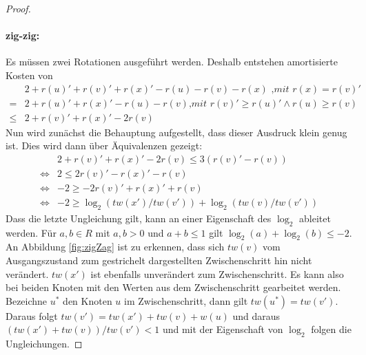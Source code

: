 \documentclass[a4paper,12pt]{article}
\begin{document}
\begin{proof}
	\paragraph{zig-zig:} 
	Es müssen zwei Rotationen ausgeführt werden. Deshalb entstehen amortisierte Kosten von
	\begin{align*}
	&2 + r\left(u\right)' +r\left(v\right)' +r\left(x\right)' - r\left(u\right)- r\left(v\right)- r\left(x\right) \textit{ ,mit $r\left(x\right) =  r\left(v\right)'$ }\\
	=& 2 + r\left(u\right)' +r\left(x\right)' - r\left(u\right)- r\left(v\right) \textit{,mit
		$r\left(v\right)' \geq  r\left(u\right)' \land r\left(u\right) \geq  r\left(v\right)$}\\
	\leq &  2 + r\left(v\right)' + r\left(x\right)' - 2 r\left(v\right) 
	\end{align*}
	Nun wird zunächst die Behauptung aufgestellt, dass dieser Ausdruck klein genug ist. Dies wird dann über Äquivalenzen gezeigt:
	\begin{align*}
	& 2 + r\left(v\right)' + r\left(x\right)' - 2 r\left(v\right) \leq  3\left(r\left(v\right)'- r\left(v\right)\right)\\
	\Leftrightarrow &2 \leq 2r\left(v\right)' -  r\left(x\right)' - r\left(v\right)\\
	\Leftrightarrow & -2 \geq -2r\left(v\right)' +  r\left(x\right)' + r\left(v\right)\\
	\Leftrightarrow & -2 \geq \log_2\left(\mathit{tw}\left(x'\right) / \mathit{tw}\left(v'\right)\right) + \log_2\left(\mathit{tw}\left(v\right) / \mathit{tw}\left(v'\right)\right)
	\end{align*}
	Dass die letzte Ungleichung gilt, kann an einer Eigenschaft des $\log_2$ ableitet werden. Für $a,b \in \mathit{R}$ mit $a,b > 0$ und $a + b \leq 1$ gilt $\log_2\left(a\right) + \log_2\left(b\right) \leq -2$. An Abbildung \ref{fig:zigZag} ist zu erkennen, dass sich $\mathit{tw}\left(v\right)$ vom Ausgangszustand zum gestrichelt dargestellten Zwischenschritt hin nicht verändert. $\mathit{tw}\left(x'\right)$ ist ebenfalls unverändert zum Zwischenschritt. Es kann also bei beiden Knoten mit den Werten aus dem Zwischenschritt gearbeitet werden. Bezeichne $u^*$ den Knoten $u$ im Zwischenschritt, dann gilt $ \mathit{tw}\left(u^*\right) = \mathit{tw}\left(v'\right)$. \\  Daraus folgt $\mathit{tw}\left(v'\right) = \mathit{tw}\left(x'\right) + \mathit{tw}\left(v\right) + w\left(u\right) $ und daraus \\ \mbox{$\left(\mathit{tw}\left(x'\right) + \mathit{tw}\left(v\right)\right) /  \mathit{tw}\left(v'\right) < 1$} und mit der Eigenschaft von $\log_2$ folgen die Ungleichungen.
	

\end{proof}
\end{document}
